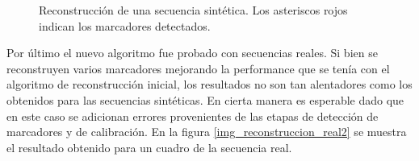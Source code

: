 \begin{figure}[!ht]
   \caption{Reconstrucción de una secuencia sintética. Los asteriscos rojos indican los marcadores detectados.} 
   \label{img_reconstruccion_sintetica}    
\end{figure} 

Por último el nuevo algoritmo fue probado con secuencias reales. Si bien se reconstruyen varios marcadores mejorando la performance que se tenía con el algoritmo de reconstrucción inicial, los resultados no son tan alentadores como los obtenidos para las secuencias sintéticas. En cierta manera es esperable dado que en este caso se adicionan errores provenientes de las etapas de detección de marcadores y de calibración. En la figura \ref{img_reconstruccion_real2} se muestra el resultado obtenido para un cuadro de la secuencia real. 

\begin{figure}[!ht]
   \centering 
    \hspace{2cm}

\end{figure}
